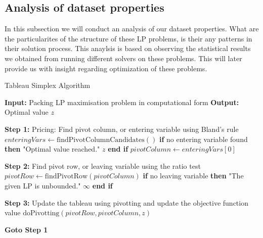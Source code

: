 \subsection{Analysis of dataset properties}
In  this subsection we will conduct an analysis of our dataset properties. What are the
particularites of the structure of these LP problems, is their any patterns in their solution
process. This anaylsis is based on observing the statistical results we obtained from
running different solvers on these problems. This will later provide us with insight
regarding optimization of these problems.

\begin{algorithm}
    \caption{Tableau Simplex Algorithm}
    \begin{algorithmic}[1]
        \State \textbf{Input:} Packing LP maximisation problem in computational form
        \State \textbf{Output:} Optimal value $z$

        \State \textbf{Step 1:} Pricing: Find pivot column, or entering variable using Bland's rule
        \State \hspace{\algorithmicindent} $enteringVars \gets \text{findPivotColumnCandidates}()$
        \State \hspace{\algorithmicindent} \textbf{if} no entering variable found \textbf{then}
        \State \hspace{\algorithmicindent} \hspace{\algorithmicindent}  "Optimal value reached."
        \State \hspace{\algorithmicindent} \hspace{\algorithmicindent} \Return $z$
        \State \hspace{\algorithmicindent} \textbf{end if}
        \State \hspace{\algorithmicindent} $pivotColumn \gets enteringVars[0]$

        \State \textbf{Step 2:} Find pivot row, or leaving variable using the ratio test
        \State \hspace{\algorithmicindent} $pivotRow \gets \text{findPivotRow}(pivotColumn)$
        \State \hspace{\algorithmicindent} \textbf{if} no leaving variable \textbf{then}
        \State \hspace{\algorithmicindent} \hspace{\algorithmicindent}  "The given LP is unbounded."
        \State \hspace{\algorithmicindent} \hspace{\algorithmicindent} \Return $\infty$
        \State \hspace{\algorithmicindent} \textbf{end if}

        \State \textbf{Step 3:} Update the tableau using pivotting and update the objective function value
        \State \hspace{\algorithmicindent} $\text{doPivotting}(pivotRow, pivotColumn, z)$

        \State \textbf{Goto Step 1}
    \end{algorithmic}
\end{algorithm}

